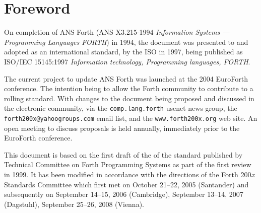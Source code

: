\chapter*{Foreword}
\label{foreword}

On completion of ANS Forth (ANS X3.215-1994 \emph{Information Systems
--- Programming Languages FORTH}) in 1994, the document was presented
to and adopted as an international standard, by the ISO in 1997, being
published as ISO/IEC 15145:1997 \emph{Information technology,
Programming languages, FORTH}.

The current project to update ANS Forth was launched at the 2004
EuroForth conference.  The intention being to allow the Forth community
to contribute to a rolling standard.  With changes to the document
being proposed and discussed in the electronic community, via the
\texttt{comp.lang.forth} usenet news group, the
\texttt{forth200x@yahoogroups.com} email list, and the
\texttt{www.forth200x.org} web site.  An open meeting to discuss
proposals is held annually, immediately prior to the EuroForth
conference.

This document is based on the first draft of the of the standard
published by Technical Committee on Forth Programming Systems as part
of the first review in 1999. It has been modified in accordance with
the directions of the Forth 200\emph{x} Standards Committee which first
met on October 21--22, 2005 (Santander) and subsequently on
September 14--15, 2006 (Cambridge),
September 13--14, 2007 (Dagstuhl),
September 25--26, 2008 (Vienna).
